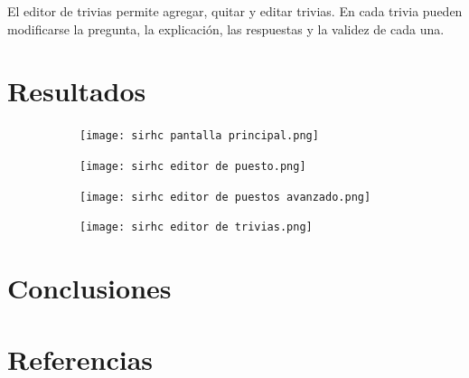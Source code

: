 \documentclass{article}
\begin{document}
El editor de trivias permite agregar, quitar y editar trivias. En cada trivia pueden modificarse la pregunta, la explicación, las respuestas y la validez de cada una.
\section{Resultados}
\begin{figure}[H]
	\caption{Pantalla principal del sistema}
    \begin{subfigure}{1\textwidth}
	\texttt{[image: sirhc pantalla principal.png]}
    \end{subfigure}
	\label{fig:pantallaPrincipal}
\end{figure}
\vspace{-1.0\baselineskip}

\begin{figure}[H]
	\caption{Editor de puesto}
    \begin{subfigure}{1\textwidth}
	\texttt{[image: sirhc editor de puesto.png]}
    \end{subfigure}
	\label{fig:editorPuesto}
\end{figure}
\vspace{-1.0\baselineskip}

\begin{figure}[H]
	\caption{Editor de puestos avanzado}
    \begin{subfigure}{1\textwidth}
	\texttt{[image: sirhc editor de puestos avanzado.png]}
    \end{subfigure}
	\label{fig:editorPuestosAvanzado}
\end{figure}
\vspace{-1.0\baselineskip}

\begin{figure}[H]
	\caption{Editor de trivias}
    \begin{subfigure}{1\textwidth}
	\texttt{[image: sirhc editor de trivias.png]}
    \end{subfigure}
	\label{fig:editorTrivias}
\end{figure}
\vspace{-1.0\baselineskip}

\section{Conclusiones}
\section{Referencias}
\begin{sloppypar}
\printbibliography[heading=none,category=cited]
\end{sloppypar}
\end{document}
